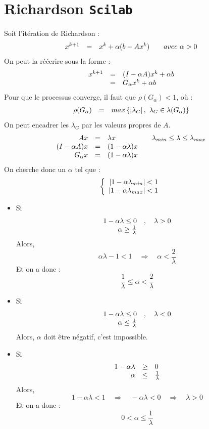 \documentclass{article}
\begin{document}
\section{Richardson \texttt{Scilab}}
Soit l'itération de Richardson : 
\[
	\begin{array}{r c l r}
		x^{k+1} & = & x^k + \alpha(b-Ax^k) & \quad avec\ \alpha > 0
	\end{array}
\]
On peut la réécrire sous la forme :
\[
	\begin{array}{r c l}
		x^{k+1} & = & (I-\alpha A)x^k + \alpha b \\
		 		& = & G_\alpha x^k + \alpha b
	\end{array}
\]
Pour que le processus converge, il faut que $\rho (G_\alpha) < 1$, où :
\[
	\begin{array}{r c l}
		\rho (G_\alpha) & = & max\left\lbrace \left| \lambda_G \right|,\ \lambda_G\in\lambda (G_\alpha)\right\rbrace
	\end{array}
\]
On peut encadrer les $\lambda_G$ par les valeurs propres de $A$.
\[
	\begin{array}{r c l r}
		Ax & = & \lambda x & \quad \lambda_{min} \leq \lambda \leq \lambda_{max}\\
		(I-\alpha A)x & = & (1-\alpha \lambda) x &\\
		G_\alpha x & = & (1-\alpha \lambda) x &\\
	\end{array}
\]
On cherche donc un $\alpha$ tel que :
\[
	\left \{
	\begin{array}{r c l}
		\left| 1 - \alpha \lambda_{min} \right| < 1 \\
		\left| 1 - \alpha \lambda_{max} \right| < 1 \\
	\end{array}
	\right .
\]
\begin{itemize}
\item Si 
\[
	\begin{array}{r c l}
		1 - \alpha \lambda \leq 0 & , \quad \lambda > 0 \\
		\alpha \geq \frac{1}{\lambda} & \\
	\end{array}
\]
Alors, 
\[
		\alpha \lambda - 1 < 1 \quad
		\Rightarrow \quad \alpha < \frac{2}{\lambda}
\]
Et on a donc :
\[
		\frac{1}{\lambda} \leq \alpha < \frac{2}{\lambda}
\]
\item Si 
\[
	\begin{array}{r c l}
		1 - \alpha \lambda \leq 0 & , \quad \lambda < 0 \\
		\alpha \leq \frac{1}{\lambda} & \\
	\end{array}
\]
Alors, $\alpha$ doit être négatif, c'est impossible.
\item Si 
\[
	\begin{array}{r c l}
		1 - \alpha \lambda & \geq & 0 \\
		\alpha & \leq & \frac{1}{\lambda} \\
	\end{array}
\]
Alors, 
\[
		1 - \alpha \lambda < 1 \quad
		\Rightarrow \quad -\alpha \lambda < 0 \quad
		\Rightarrow \quad \lambda > 0
\]
Et on a donc :
\[
		0 < \alpha \leq \frac{1}{\lambda}
\]
\end{itemize}
\end{document}
